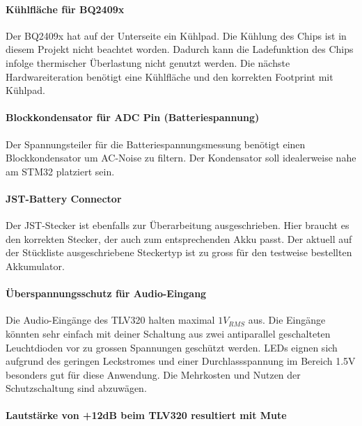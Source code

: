 \paragraph{Kühlfläche für BQ2409x}

Der BQ2409x hat auf der Unterseite ein Kühlpad. Die Kühlung des Chips ist in diesem Projekt nicht beachtet worden. Dadurch kann die Ladefunktion des Chips infolge thermischer Überlastung nicht genutzt werden. Die nächste Hardwareiteration benötigt eine Kühlfläche und den korrekten Footprint mit Kühlpad.

\paragraph{Blockkondensator für ADC Pin (Batteriespannung)}

Der Spannungsteiler für die Batteriespannungsmessung benötigt einen Blockkondensator um AC-Noise zu filtern. Der Kondensator soll idealerweise nahe am STM32 platziert sein.

\paragraph{JST-Battery Connector}

Der JST-Stecker ist ebenfalls zur Überarbeitung ausgeschrieben. Hier braucht es den korrekten Stecker, der auch zum entsprechenden Akku passt. 
Der aktuell auf der Stückliste ausgeschriebene Steckertyp ist zu gross für den testweise bestellten Akkumulator.


\paragraph{Überspannungsschutz für Audio-Eingang}

Die Audio-Eingänge des TLV320 halten maximal $1\si{V_{RMS}}$ aus. Die Eingänge könnten sehr einfach mit deiner Schaltung aus zwei antiparallel geschalteten Leuchtdioden vor zu grossen Spannungen geschützt werden. LEDs eignen sich aufgrund des geringen Leckstromes und einer Durchlassspannung im Bereich 1.5V besonders gut für diese Anwendung.
Die Mehrkosten und Nutzen der Schutzschaltung sind abzuwägen.

\paragraph{Lautstärke von +12dB beim TLV320 resultiert mit Mute}

